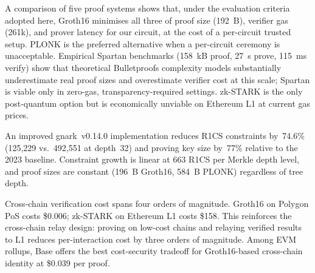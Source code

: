 \documentclass[conference]{IEEEtran}
\begin{document}
A comparison of five proof systems shows that, under the evaluation
criteria adopted here, Groth16 minimises all three of proof size
(192~B), verifier gas (261k), and prover latency for our circuit, at
the cost of a per-circuit trusted setup.
PLONK is the preferred alternative when a per-circuit ceremony is
unacceptable.
Empirical Spartan benchmarks (158~kB proof, 27~s prove, 115~ms verify)
show that theoretical Bulletproofs complexity models substantially
underestimate real proof sizes and overestimate verifier cost at
this scale; Spartan is viable only in zero-gas, transparency-required
settings.
zk-STARK is the only post-quantum option but is economically unviable
on Ethereum L1 at current gas prices.

An improved gnark~v0.14.0 implementation reduces R1CS constraints
by~74.6\% (125,229 vs.\ 492,551 at depth~32) and proving key size by~77\%
relative to the 2023 baseline.
Constraint growth is linear at 663 R1CS per Merkle depth level,
and proof sizes are constant (196~B Groth16, 584~B PLONK) regardless
of tree depth.

Cross-chain verification cost spans four orders of magnitude.
Groth16 on Polygon PoS costs \$0.006; zk-STARK on Ethereum L1 costs
\$158.
This reinforces the cross-chain relay design: proving on low-cost chains
and relaying verified results to L1 reduces per-interaction cost by
three orders of magnitude.
Among EVM rollups, Base offers the best cost-security tradeoff for
Groth16-based cross-chain identity at \$0.039 per proof.



\end{document}
